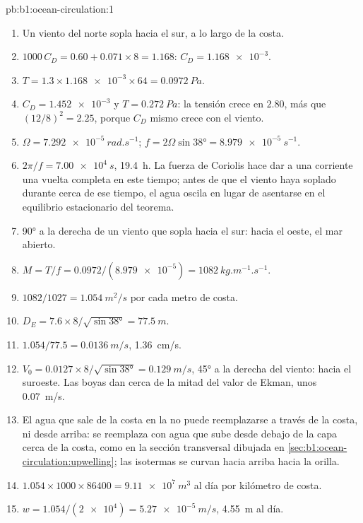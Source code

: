 \begin{solution}{pb:b1:ocean-circulation:1}
\begin{enumerate}
  \item Un viento del norte sopla hacia el sur, a lo largo de la costa.
  \item $1000\,C_D = 0.60 + 0.071 \times 8 = 1.168$: $C_D = \num{1.168e-3}$.
  \item $T = 1.3 \times \num{1.168e-3} \times 64 = \qty{0.0972}{Pa}$.
  \item $C_D = \num{1.452e-3}$ y $T = \qty{0.272}{Pa}$: la tensión crece en $2.80$,
        más que $(12/8)^2 = 2.25$, porque $C_D$ mismo crece con el viento.
  \item $\Omega = \qty{7.292e-5}{rad.s^{-1}}$; $f = 2\Omega\sin\ang{38} =
        \qty{8.979e-5}{s^{-1}}$.
  \item $2\pi/f = \qty{7.00e4}{s}$, \qty{19.4}{h}. La fuerza de Coriolis hace dar a una corriente una vuelta completa en este tiempo; antes de que el viento haya soplado durante
        cerca de ese tiempo, el agua oscila en lugar de asentarse en el equilibrio estacionario del teorema.
  \item \ang{90} a la derecha de un viento que sopla hacia el sur: hacia el oeste, el mar abierto.
  \item $M = T/f = 0.0972/(\num{8.979e-5}) = \qty{1082}{kg.m^{-1}.s^{-1}}$.
  \item $1082/1027 = \qty{1.054}{m^2/s}$ por cada metro de costa.
  \item $D_E = 7.6 \times 8/\sqrt{\sin\ang{38}} = \qty{77.5}{m}$.
  \item $1.054/77.5 = \qty{0.0136}{m/s}$, \qty{1.36}{cm/s}.
  \item $V_0 = 0.0127 \times 8/\sqrt{\sin\ang{38}} = \qty{0.129}{m/s}$, \ang{45} a la derecha del viento: hacia el suroeste. Las boyas dan cerca de la mitad del valor de Ekman, unos \qty{0.07}{m/s}.
  \item El agua que sale de la costa en la  no puede reemplazarse a través de la costa, ni desde arriba: se reemplaza con agua que sube desde debajo de la capa cerca de la costa, como en la sección transversal dibujada en \cref{sec:b1:ocean-circulation:upwelling}; las isotermas se curvan hacia arriba hacia la orilla.
  \item $1.054 \times 1000 \times 86400 = \qty{9.11e7}{m^3}$ al día por kilómetro de costa.
  \item $w = 1.054/(\num{2e4}) = \qty{5.27e-5}{m/s}$, \qty{4.55}{m} al día.

\end{enumerate}
\end{solution}
